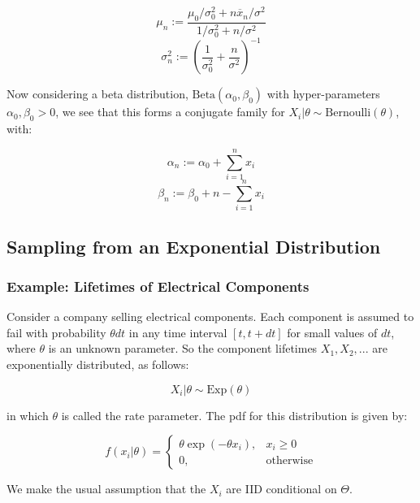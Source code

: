 \documentclass[a4paper]{article}
\begin{document}
            \[
                \mu_n := \frac{\mu_0/\sigma_0^2 + n\overline x_n/\sigma^2}{1/
                \sigma_0^2 + n/\sigma^2}
            \]
            \[
                \sigma_n^2 := \left(\frac{1}{\sigma_0^2} + \frac{n}{\sigma^2}
                \right)^{-1}
            \]

            Now considering a beta distribution, $\text{Beta}(\alpha_0, \beta_0)
            $ with hyper-parameters $\alpha_0, \beta_0 > 0$, we see that this
            forms a conjugate family for $X_i | \theta \sim
            \text{Bernoulli}(\theta)$, with:

            \[
                \alpha_n := \alpha_0 + \sum\limits_{i=1}^n x_i
            \]
            \[
                \beta_n := \beta_0 + n - \sum\limits_{i=1}^n x_i
            \]


        \subsection{Sampling from an Exponential Distribution}
            \begin{fread}
                [DS12]
            \end{fread}

            \subsubsection{Example: Lifetimes of Electrical Components}
                Consider a company selling electrical components. Each component
                is assumed to fail with probability $\theta dt$ in any time
                interval $[t, t + dt]$ for small values of $dt$, where $\theta$
                is an unknown parameter. So the component lifetimes $X_1, X_2,
                ...$ are exponentially distributed, as follows:

                \[
                    X_i | \theta \sim \text{Exp}(\theta)
                \]

                in which $\theta$ is called the rate parameter. The pdf for this
                distribution is given by:

                \[
                    f(x_i | \theta) = \begin{cases}\theta \exp{(-\theta x_i)}, &
                    x_i \geq 0 \\ 0, & \text{otherwise}\end{cases}
                \]

                We make the usual assumption that the $X_i$ are IID conditional
                on $\Theta$.
\end{document}
